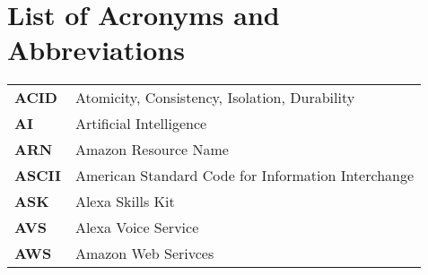 \section*{List of Acronyms and Abbreviations }
\begin{flushleft}
\begin{tabular}{ll}



\textbf{ACID}	&	Atomicity, Consistency, Isolation, Durability\\ %
\textbf{AI}		&	Artificial Intelligence\\
\textbf{ARN}	&	Amazon Resource Name\\
\textbf{ASCII}&	American Standard Code for Information Interchange\\%
\textbf{ASK}	&	Alexa Skills Kit\\
\textbf{AVS}	&	Alexa Voice Service\\
\textbf{AWS}	&	Amazon Web Serivces\\


\end{tabular}
\end{flushleft}

